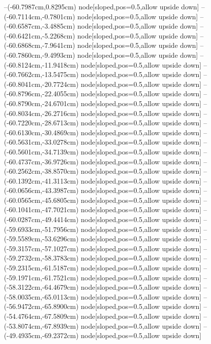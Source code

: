 --(-60.7987cm,0.8295cm) node[sloped,pos=0.5,allow upside down]{\ArrowIn}
--(-60.7114cm,-0.7801cm) node[sloped,pos=0.5,allow upside down]{\ArrowIn}
--(-60.6587cm,-3.4885cm) node[sloped,pos=0.5,allow upside down]{\ArrowIn}
--(-60.6421cm,-5.2268cm) node[sloped,pos=0.5,allow upside down]{\ArrowIn}
--(-60.6868cm,-7.9641cm) node[sloped,pos=0.5,allow upside down]{\ArrowIn}
--(-60.7860cm,-9.4993cm) node[sloped,pos=0.5,allow upside down]{\ArrowIn}
--(-60.8124cm,-11.9418cm) node[sloped,pos=0.5,allow upside down]{\ArrowIn}
--(-60.7662cm,-13.5475cm) node[sloped,pos=0.5,allow upside down]{\ArrowIn}
--(-60.8041cm,-20.7724cm) node[sloped,pos=0.5,allow upside down]{\ArrowIn}
--(-60.8796cm,-22.4055cm) node[sloped,pos=0.5,allow upside down]{\ArrowIn}
--(-60.8790cm,-24.6701cm) node[sloped,pos=0.5,allow upside down]{\ArrowIn}
--(-60.8034cm,-26.2716cm) node[sloped,pos=0.5,allow upside down]{\ArrowIn}
--(-60.7220cm,-28.6713cm) node[sloped,pos=0.5,allow upside down]{\ArrowIn}
--(-60.6130cm,-30.4869cm) node[sloped,pos=0.5,allow upside down]{\ArrowIn}
--(-60.5631cm,-33.0278cm) node[sloped,pos=0.5,allow upside down]{\ArrowIn}
--(-60.5601cm,-34.7139cm) node[sloped,pos=0.5,allow upside down]{\ArrowIn}
--(-60.4737cm,-36.9726cm) node[sloped,pos=0.5,allow upside down]{\ArrowIn}
--(-60.2562cm,-38.8570cm) node[sloped,pos=0.5,allow upside down]{\ArrowIn}
--(-60.1392cm,-41.3113cm) node[sloped,pos=0.5,allow upside down]{\ArrowIn}
--(-60.0656cm,-43.3987cm) node[sloped,pos=0.5,allow upside down]{\ArrowIn}
--(-60.0565cm,-45.6805cm) node[sloped,pos=0.5,allow upside down]{\ArrowIn}
--(-60.1041cm,-47.7021cm) node[sloped,pos=0.5,allow upside down]{\ArrowIn}
--(-60.0287cm,-49.4414cm) node[sloped,pos=0.5,allow upside down]{\ArrowIn}
--(-59.6933cm,-51.7956cm) node[sloped,pos=0.5,allow upside down]{\ArrowIn}
--(-59.5589cm,-53.6296cm) node[sloped,pos=0.5,allow upside down]{\ArrowIn}
--(-59.3157cm,-57.1027cm) node[sloped,pos=0.5,allow upside down]{\ArrowIn}
--(-59.2732cm,-58.3783cm) node[sloped,pos=0.5,allow upside down]{\ArrowIn}
--(-59.2315cm,-61.5187cm) node[sloped,pos=0.5,allow upside down]{\ArrowIn}
--(-59.1971cm,-61.7521cm) node[sloped,pos=0.5,allow upside down]{\arrowIn}
--(-58.3122cm,-64.4679cm) node[sloped,pos=0.5,allow upside down]{\ArrowIn}
--(-58.0035cm,-65.0113cm) node[sloped,pos=0.5,allow upside down]{\arrowIn}
--(-56.9472cm,-65.8900cm) node[sloped,pos=0.5,allow upside down]{\ArrowIn}
--(-54.4764cm,-67.5809cm) node[sloped,pos=0.5,allow upside down]{\ArrowIn}
--(-53.8074cm,-67.8939cm) node[sloped,pos=0.5,allow upside down]{\arrowIn}
--(-49.4935cm,-69.2372cm) node[sloped,pos=0.5,allow upside down]{\ArrowIn}
